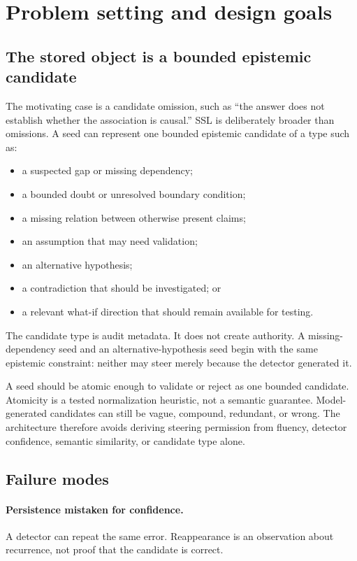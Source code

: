 \documentclass[11pt]{article}
\begin{document}
\section{Problem setting and design goals}
\label{sec:problem}

\subsection{The stored object is a bounded epistemic candidate}

The motivating case is a candidate omission, such as ``the answer does not establish whether the association is causal.'' SSL is deliberately broader than omissions. A seed can represent one bounded epistemic candidate of a type such as:
\begin{itemize}[leftmargin=1.5em]
  \item a suspected gap or missing dependency;
  \item a bounded doubt or unresolved boundary condition;
  \item a missing relation between otherwise present claims;
  \item an assumption that may need validation;
  \item an alternative hypothesis;
  \item a contradiction that should be investigated; or
  \item a relevant what-if direction that should remain available for testing.
\end{itemize}
The candidate type is audit metadata. It does not create authority. A missing-dependency seed and an alternative-hypothesis seed begin with the same epistemic constraint: neither may steer merely because the detector generated it.

A seed should be atomic enough to validate or reject as one bounded candidate. Atomicity is a tested normalization heuristic, not a semantic guarantee. Model-generated candidates can still be vague, compound, redundant, or wrong. The architecture therefore avoids deriving steering permission from fluency, detector confidence, semantic similarity, or candidate type alone.

\subsection{Failure modes}

\paragraph{Persistence mistaken for confidence.}
A detector can repeat the same error. Reappearance is an observation about recurrence, not proof that the candidate is correct.
\end{document}

